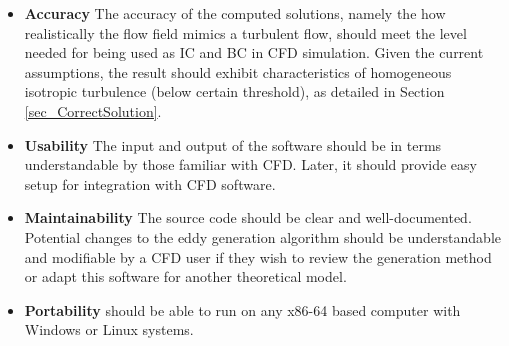 \documentclass[12pt]{article}
\newcounter{nfrnum} %
\begin{document}
\noindent \begin{itemize}

\item[NFR\refstepcounter{nfrnum}\thenfrnum \label{NFR_Accuracy}:]
  \textbf{Accuracy} The accuracy of the computed solutions, namely the how realistically the flow field mimics a turbulent flow, should meet the level needed for being used as IC and BC in CFD simulation. Given the current assumptions, the result should exhibit characteristics of homogeneous isotropic turbulence (below certain threshold), as detailed in Section \ref{sec_CorrectSolution}.

\item[NFR\refstepcounter{nfrnum}\thenfrnum \label{NFR_Usability}:] \textbf{Usability} The input and output of the software should be in terms understandable by those familiar with CFD. Later, it should provide easy setup for integration with CFD software.

\item[NFR\refstepcounter{nfrnum}\thenfrnum \label{NFR_Maintainability}:]
  \textbf{Maintainability} The source code should be clear and well-documented. Potential changes to the eddy generation algorithm should be understandable and modifiable by a CFD user if they wish to review the generation method or adapt this software for another theoretical model. 

\item[NFR\refstepcounter{nfrnum}\thenfrnum \label{NFR_Portability}:]
  \textbf{Portability} \progname{} should be able to run on any x86-64 based computer with Windows or Linux systems.


\end{itemize}
\end{document}
